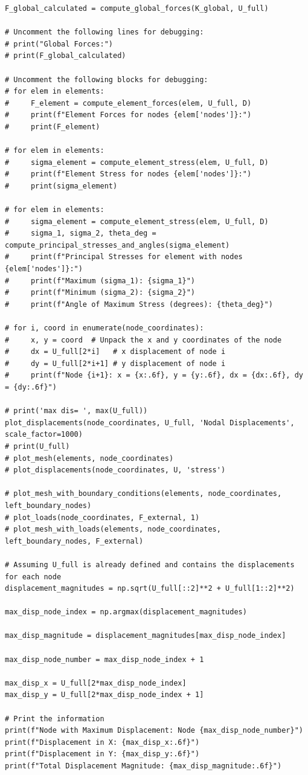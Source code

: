 \documentclass[12pt]{report}
\begin{document}
\begin{lstlisting}[style=mypython]
F_global_calculated = compute_global_forces(K_global, U_full)

# Uncomment the following lines for debugging:
# print("Global Forces:")
# print(F_global_calculated)

# Uncomment the following blocks for debugging:
# for elem in elements:
#     F_element = compute_element_forces(elem, U_full, D)  
#     print(f"Element Forces for nodes {elem['nodes']}:")
#     print(F_element)

# for elem in elements:
#     sigma_element = compute_element_stress(elem, U_full, D)  
#     print(f"Element Stress for nodes {elem['nodes']}:")
#     print(sigma_element)

# for elem in elements:
#     sigma_element = compute_element_stress(elem, U_full, D) 
#     sigma_1, sigma_2, theta_deg = compute_principal_stresses_and_angles(sigma_element)
#     print(f"Principal Stresses for element with nodes {elem['nodes']}:")
#     print(f"Maximum (sigma_1): {sigma_1}")
#     print(f"Minimum (sigma_2): {sigma_2}")
#     print(f"Angle of Maximum Stress (degrees): {theta_deg}")

# for i, coord in enumerate(node_coordinates):
#     x, y = coord  # Unpack the x and y coordinates of the node
#     dx = U_full[2*i]   # x displacement of node i
#     dy = U_full[2*i+1] # y displacement of node i
#     print(f"Node {i+1}: x = {x:.6f}, y = {y:.6f}, dx = {dx:.6f}, dy = {dy:.6f}")

# print('max dis= ', max(U_full))
plot_displacements(node_coordinates, U_full, 'Nodal Displacements', scale_factor=1000)
# print(U_full)
# plot_mesh(elements, node_coordinates)
# plot_displacements(node_coordinates, U, 'stress')

# plot_mesh_with_boundary_conditions(elements, node_coordinates, left_boundary_nodes)
# plot_loads(node_coordinates, F_external, 1)
# plot_mesh_with_loads(elements, node_coordinates, left_boundary_nodes, F_external)

# Assuming U_full is already defined and contains the displacements for each node
displacement_magnitudes = np.sqrt(U_full[::2]**2 + U_full[1::2]**2)

max_disp_node_index = np.argmax(displacement_magnitudes)

max_disp_magnitude = displacement_magnitudes[max_disp_node_index]

max_disp_node_number = max_disp_node_index + 1

max_disp_x = U_full[2*max_disp_node_index]
max_disp_y = U_full[2*max_disp_node_index + 1]

# Print the information
print(f"Node with Maximum Displacement: Node {max_disp_node_number}")
print(f"Displacement in X: {max_disp_x:.6f}")
print(f"Displacement in Y: {max_disp_y:.6f}")
print(f"Total Displacement Magnitude: {max_disp_magnitude:.6f}")

\end{lstlisting}
\end{document}
